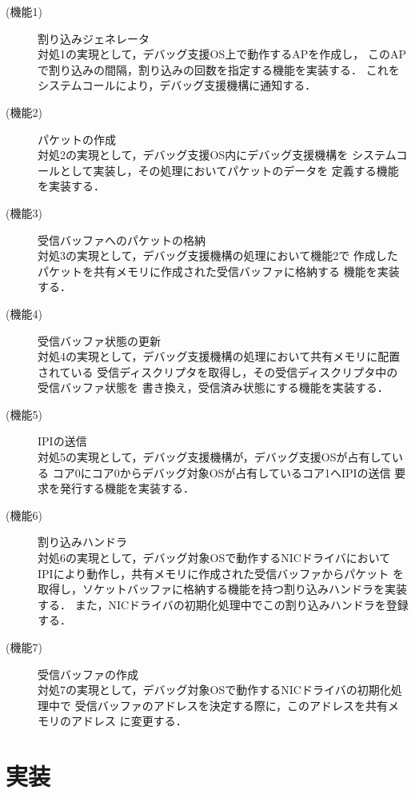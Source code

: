 \documentclass[tanilab-enum]{graduate}
\begin{document}
\begin{description}
    \item[(機能1)]割り込みジェネレータ\\
        対処1の実現として，デバッグ支援OS上で動作するAPを作成し，
        このAPで割り込みの間隔，割り込みの回数を指定する機能を実装する．
        これをシステムコールにより，デバッグ支援機構に通知する．
    \item[(機能2)]パケットの作成\\
        対処2の実現として，デバッグ支援OS内にデバッグ支援機構を
        システムコールとして実装し，その処理においてパケットのデータを
        定義する機能を実装する．
    \item[(機能3)]受信バッファへのパケットの格納\\
        対処3の実現として，デバッグ支援機構の処理において機能2で
        作成したパケットを共有メモリに作成された受信バッファに格納する
        機能を実装する．
    \item[(機能4)]受信バッファ状態の更新\\
        対処4の実現として，デバッグ支援機構の処理において共有メモリに配置されている
        受信ディスクリプタを取得し，その受信ディスクリプタ中の受信バッファ状態を
        書き換え，受信済み状態にする機能を実装する．
    \item[(機能5)]IPIの送信\\
        対処5の実現として，デバッグ支援機構が，デバッグ支援OSが占有している
        コア0にコア0からデバッグ対象OSが占有しているコア1へIPIの送信
        要求を発行する機能を実装する．
    \item[(機能6)]割り込みハンドラ\\
        対処6の実現として，デバッグ対象OSで動作するNICドライバにおいて
        IPIにより動作し，共有メモリに作成された受信バッファからパケット
        を取得し，ソケットバッファに格納する機能を持つ割り込みハンドラを実装する．
        また，NICドライバの初期化処理中でこの割り込みハンドラを登録する．
    \item[(機能7)]受信バッファの作成\\
        対処7の実現として，デバッグ対象OSで動作するNICドライバの初期化処理中で
        受信バッファのアドレスを決定する際に，このアドレスを共有メモリのアドレス
        に変更する．
\end{description}

\chapter{実装}\label{chap:implementation}
\end{document}

